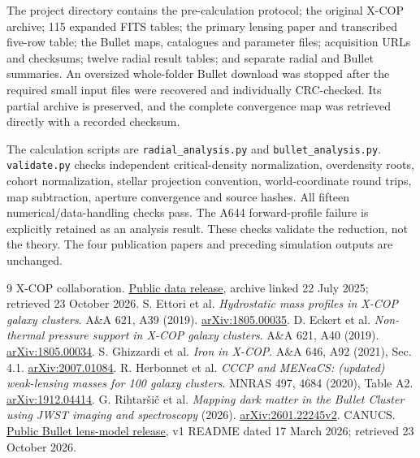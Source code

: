 \documentclass[11pt]{article}
\begin{document}
The project directory contains the pre-calculation protocol; the original X-COP archive; 115 expanded FITS tables; the primary lensing paper and transcribed five-row table; the Bullet maps, catalogues and parameter files; acquisition URLs and checksums; twelve radial result tables; and separate radial and Bullet summaries. An oversized whole-folder Bullet download was stopped after the required small input files were recovered and individually CRC-checked. Its partial archive is preserved, and the complete convergence map was retrieved directly with a recorded checksum.

The calculation scripts are \texttt{radial\_analysis.py} and \texttt{bullet\_analysis.py}. \texttt{validate.py} checks independent critical-density normalization, overdensity roots, cohort normalization, stellar projection convention, world-coordinate round trips, map subtraction, aperture convergence and source hashes. All fifteen numerical/data-handling checks pass. The A644 forward-profile failure is explicitly retained as an analysis result. These checks validate the reduction, not the theory. The four publication papers and preceding simulation outputs are unchanged.

\begin{thebibliography}{9}\small
{} X-COP collaboration. \href{https://dominiqueeckert.wixsite.com/xcop/data}{Public data release}, archive linked 22 July 2025; retrieved 23 October 2026.
 S. Ettori et al. \emph{Hydrostatic mass profiles in X-COP galaxy clusters}. A\&A 621, A39 (2019). \href{https://arxiv.org/abs/1805.00035}{arXiv:1805.00035}.
 D. Eckert et al. \emph{Non-thermal pressure support in X-COP galaxy clusters}. A\&A 621, A40 (2019). \href{https://arxiv.org/abs/1805.00034}{arXiv:1805.00034}.
 S. Ghizzardi et al. \emph{Iron in X-COP}. A\&A 646, A92 (2021), Sec. 4.1. \href{https://arxiv.org/abs/2007.01084}{arXiv:2007.01084}.
 R. Herbonnet et al. \emph{CCCP and MENeaCS: (updated) weak-lensing masses for 100 galaxy clusters}. MNRAS 497, 4684 (2020), Table A2. \href{https://arxiv.org/abs/1912.04414}{arXiv:1912.04414}.
 G. Rihtar\v{s}i\v{c} et al. \emph{Mapping dark matter in the Bullet Cluster using JWST imaging and spectroscopy} (2026). \href{https://arxiv.org/html/2601.22245v2}{arXiv:2601.22245v2}.
 CANUCS. \href{https://niriss.github.io/lensing.html}{Public Bullet lens-model release}, v1 README dated 17 March 2026; retrieved 23 October 2026.
\end{thebibliography}
\end{document}

